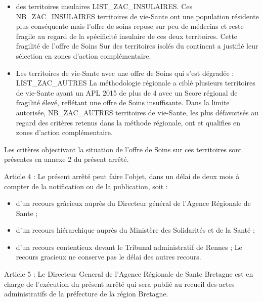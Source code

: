 \documentclass[]{article}
\providecommand{\tightlist}{%
  \setlength{\itemsep}{0pt}\setlength{\parskip}{0pt}}
\begin{document}
\begin{itemize}
\tightlist
\item
  des territoires insulaires LIST\_ZAC\_INSULAIRES. Ces
  NB\_ZAC\_INSULAIRES territoires de vie-Sante ont une population
  résidente plus conséquente mais l'offre de soins repose sur peu de
  médecins et reste fragile au regard de la spécificité insulaire de ces
  deux territoires. Cette fragilité de l'offre de Soins Sur des
  territoires isolés du continent a justifié leur sélection en zones
  d'action complémentaire.
\item
  Les territoires de vie-Sante avec une offre de Soins qui s'est
  dégradée : LIST\_ZAC\_AUTRES La méthodologie régionale a ciblé
  plusieurs territoires de vie-Sante ayant un APL 2015 de plus de 4 avec
  un Score régional de fragilité élevé, reflétant une offre de Soins
  insuffisante. Dans la limite autorisée, NB\_ZAC\_AUTRES territoires de
  vie-Sante, les plus défavorisés au regard des critères retenus dans la
  méthode régionale, ont et qualifies en zones d'action complémentaire.
\end{itemize}

Les critères objectivant la situation de l'offre de Soins sur ces
territoires sont présentes en annexe 2 du présent arrêté.

Article 4 : Le présent arrêté peut faire l'objet, dans un délai de deux
mois à compter de la notification ou de la publication, soit :

\begin{itemize}
\item
  d'un recours grâcieux auprès du Directeur général de l'Agence
  Régionale de Sante ;
\item
  d'un recours hiérarchique auprès du Ministère des Solidarités et de la
  Santé ;
\item
  d'un recours contentieux devant le Tribunal administratif de Rennes ;
  Le recours gracieux ne conserve pas le délai des autres recours.
\end{itemize}

Article 5 : Le Directeur General de l'Agence Régionale de Sante Bretagne
est en charge de l'exécution du présent arrêté qui sera publié au
recueil des actes administratifs de la préfecture de la région Bretagne.
\end{document}

